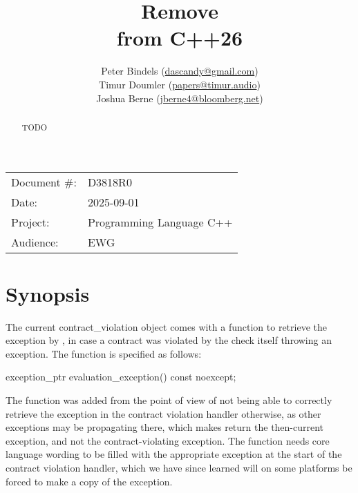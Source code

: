 

 \usepackage[bottom]{footmisc} 



\title{Remove  \\ from C++26}
\author{
  Peter Bindels \small(\href{mailto:dascandy@gmail.com}{dascandy@gmail.com}) \\
  Timur Doumler \small(\href{mailto:papers@timur.audio}{papers@timur.audio}) \\
  Joshua Berne \small(\href{mailto:jberne4@bloomberg.net}{jberne4@bloomberg.net}) \\
}
\date{}
\maketitle

\begin{tabular}{ll}
Document \#: & D3818R0 \\
Date: &2025-09-01 \\
Project: & Programming Language C++ \\
Audience: & EWG
\end{tabular}

\begin{abstract}
TODO
\end{abstract}


\section{Synopsis}

The current contract_violation object comes with a function to retrieve the exception by , in case a contract was violated by the check itself throwing an exception. The function is specified as follows:

\begin{codeblock}
exception_ptr evaluation_exception() const noexcept;
\end{codeblock}

The function was added from the point of view of not being able to correctly retrieve the exception in the contract violation handler otherwise, as other exceptions may be propagating there, which makes  return the then-current exception, and not the contract-violating exception. The function needs core language wording to be filled with the appropriate exception at the start of the contract violation handler, which we have since learned will on some platforms be forced to make a copy of the exception.

